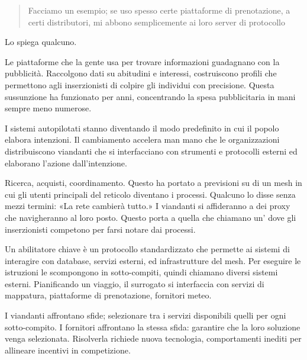 \begin{quote}
Facciamo un esempio; se uso spesso certe piattaforme di prenotazione, a certi distributori, mi abbono semplicemente ai loro server di protocollo
\end{quote}

Lo spiega qualcuno.

Le piattaforme che la gente usa per trovare informazioni guadagnano con la pubblicità. Raccolgono dati su abitudini e interessi, costruiscono profili che permettono agli inserzionisti di colpire gli individui con precisione. Questa sussunzione ha funzionato per anni, concentrando la spesa pubblicitaria in mani sempre meno numerose.


I sistemi autopilotati stanno diventando il modo predefinito in cui il popolo elabora intenzioni. Il cambiamento accelera man mano che le organizzazioni distribuiscono viandanti che si interfacciano con strumenti e protocolli esterni ed elaborano l'azione dall'intenzione.

Ricerca, acquisti, coordinamento. Questo ha portato a previsioni su di un mesh in cui gli utenti principali del reticolo diventano i processi. Qualcuno lo disse senza mezzi termini: «La rete cambierà tutto.» I viandanti si affideranno a dei proxy che navigheranno al loro posto. Questo porta a quella che chiamano un' dove gli inserzionisti competono per farsi notare dai processi.

Un abilitatore chiave è un protocollo standardizzato che permette ai sistemi di interagire con database, servizi esterni, ed infrastrutture del mesh. Per eseguire le istruzioni le scompongono in sotto-compiti, quindi chiamano diversi sistemi esterni. Pianificando un viaggio, il surrogato si interfaccia con servizi di mappatura, piattaforme di prenotazione, fornitori meteo.

I viandanti affrontano sfide; selezionare tra i servizi disponibili quelli per ogni sotto-compito. I fornitori affrontano la stessa sfida: garantire che la loro soluzione venga selezionata. Risolverla richiede nuova tecnologia, comportamenti inediti per allineare incentivi in competizione.


